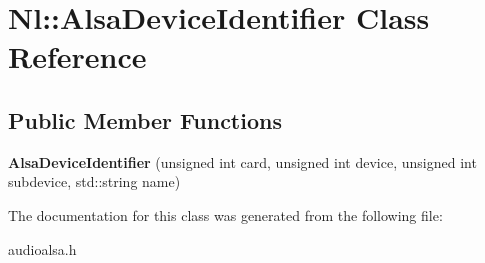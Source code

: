 \hypertarget{classNl_1_1AlsaDeviceIdentifier}{}\section{Nl\+:\+:Alsa\+Device\+Identifier Class Reference}
\label{classNl_1_1AlsaDeviceIdentifier}
\subsection*{Public Member Functions}
\begin{DoxyCompactItemize}
\item 
\hypertarget{classNl_1_1AlsaDeviceIdentifier_a6c5d83b4bcd9a66ac98b66cdd6d8318b}{}{\bfseries Alsa\+Device\+Identifier} (unsigned int card, unsigned int device, unsigned int subdevice, std\+::string name)\label{classNl_1_1AlsaDeviceIdentifier_a6c5d83b4bcd9a66ac98b66cdd6d8318b}

\end{DoxyCompactItemize}


The documentation for this class was generated from the following file\+:\begin{DoxyCompactItemize}
\item 
audioalsa.\+h\end{DoxyCompactItemize}

